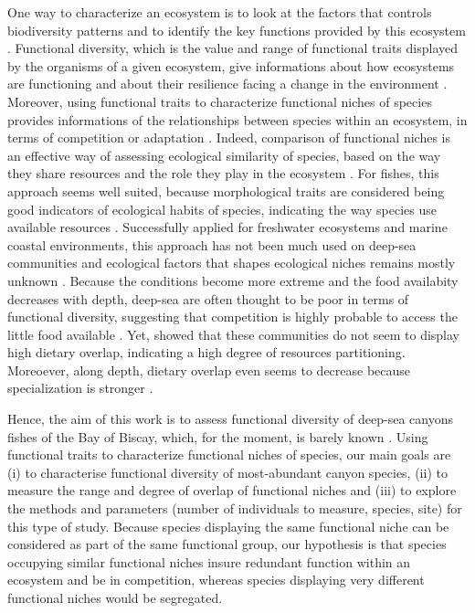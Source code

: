 One way to characterize an ecosystem is to look at the factors that controls biodiversity patterns and to identify the key functions provided by this ecosystem \citep{aneeshkumar2017,brindamour2011,farre2016}. Functional diversity, which is the value and range of functional traits displayed by the organisms of a given ecosystem, give informations about how ecosystems are functioning and about their resilience facing a change in the environment \citep{dumay2004,martini2020}. Moreover, using functional traits to characterize functional niches of species provides informations of the relationships between species within an ecosystem, in terms of competition or adaptation \citep{aneeshkumar2017}. Indeed, comparison of functional niches is an effective way of assessing ecological similarity of species, based on the way they share resources and the role they play in the ecosystem \citep{aneeshkumar2017,farre2016,winemiller1991}.
For fishes, this approach seems well suited, because morphological traits are considered being good indicators of ecological habits of species, indicating the way species use available resources \citep{farre2016,winemiller1991}. Successfully applied for freshwater ecosystems and marine coastal environments, this approach has not been much used on deep-sea communities and ecological factors that shapes ecological niches remains mostly unknown \citet{aneeshkumar2017,farre2016}. Because the conditions become more extreme and the food availabity decreases with depth, deep-sea are often thought to be poor in terms of functional diversity, suggesting that competition is highly probable to access the little food available \citep{aneeshkumar2017}. Yet, \citet{preciado2017} showed that these communities do not seem to display high dietary overlap, indicating a high degree of resources partitioning. Moreoever, along depth, dietary overlap even seems to decrease because specialization is stronger \citep{carrasson2002}. 

Hence, the aim of this work is to assess functional diversity of deep-sea canyons fishes of the Bay of Biscay, which, for the moment, is barely known \citep{kenchington2020}. Using functional traits to characterize functional niches of species, our main goals are (i) to characterise functional diversity of most-abundant canyon species, (ii) to measure the range and degree of overlap of functional niches and (iii) to explore the methods and parameters (number of individuals to measure, species, site) for this type of study. Because species displaying the same functional niche can be considered as part of the same functional group, our hypothesis is that species occupying similar functional niches insure redundant function within an ecosystem and be in competition, whereas species displaying very different functional niches would be segregated. 

